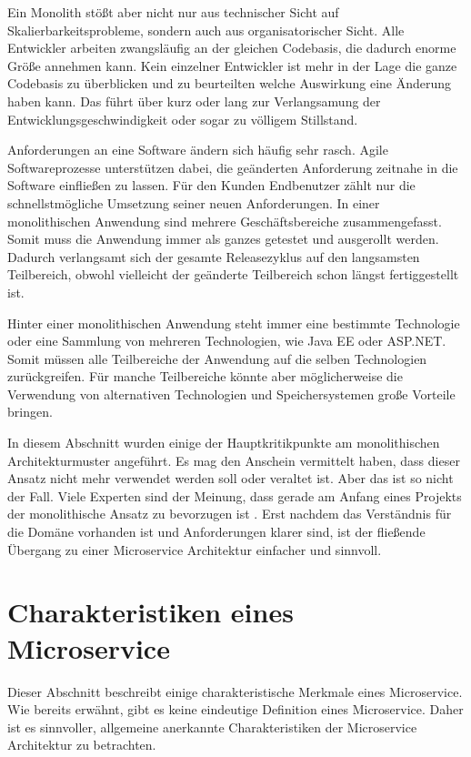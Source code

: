 Ein Monolith stößt aber nicht nur aus technischer Sicht auf Skalierbarkeitsprobleme, sondern auch aus organisatorischer Sicht. Alle Entwickler arbeiten zwangsläufig an der gleichen Codebasis, die dadurch enorme Größe annehmen kann. Kein einzelner Entwickler ist mehr in der Lage die ganze Codebasis zu überblicken und zu beurteilten welche Auswirkung eine Änderung haben kann. Das führt über kurz oder lang zur Verlangsamung der Entwicklungsgeschwindigkeit oder sogar zu völligem Stillstand.

Anforderungen an eine Software ändern sich häufig sehr rasch. Agile Softwareprozesse unterstützen dabei, die geänderten Anforderung zeitnahe in die Software einfließen zu lassen. Für den Kunden \bzw Endbenutzer zählt nur die schnellstmögliche Umsetzung seiner neuen Anforderungen. In einer monolithischen Anwendung sind mehrere Geschäftsbereiche zusammengefasst. Somit muss die Anwendung immer als ganzes getestet und ausgerollt werden. Dadurch verlangsamt sich der gesamte Releasezyklus auf den langsamsten Teilbereich, obwohl vielleicht der geänderte Teilbereich schon längst fertiggestellt ist.

Hinter einer monolithischen Anwendung steht immer eine bestimmte Technologie oder eine Sammlung von mehreren Technologien, wie \zB Java EE oder ASP.NET. Somit müssen alle Teilbereiche der Anwendung auf die selben Technologien zurückgreifen. Für manche Teilbereiche könnte aber möglicherweise die Verwendung von alternativen Technologien und Speichersystemen große Vorteile bringen.

In diesem Abschnitt wurden einige der Hauptkritikpunkte am monolithischen Architekturmuster angeführt. Es mag den Anschein vermittelt haben, dass dieser Ansatz nicht mehr verwendet werden soll oder veraltet ist. Aber das ist so nicht der Fall. Viele Experten sind der Meinung, dass gerade am Anfang eines Projekts der monolithische Ansatz zu bevorzugen ist \cite{FowlerMolithFist}. Erst nachdem das Verständnis für die Domäne vorhanden ist und Anforderungen klarer sind, ist der fließende Übergang zu einer Microservice Architektur einfacher und sinnvoll. 

\section{Charakteristiken eines Microservice}

Dieser Abschnitt beschreibt einige charakteristische Merkmale eines Microservice. Wie bereits erwähnt, gibt es keine eindeutige Definition eines Microservice. Daher ist es sinnvoller, allgemeine anerkannte Charakteristiken der Microservice Architektur zu betrachten.
 

